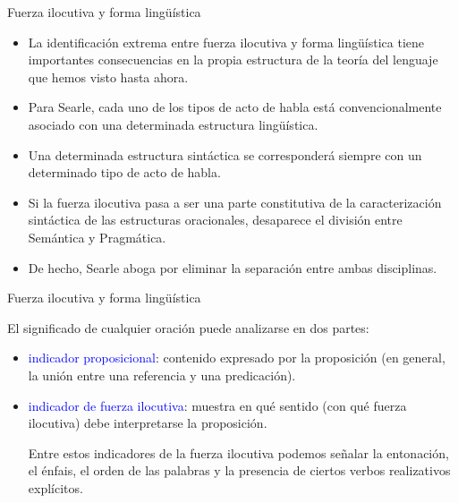 \documentclass{beamer}
\begin{document}
\begin{frame}{Fuerza ilocutiva y forma lingüística}

\begin{itemize}
	\item La identificación extrema entre fuerza ilocutiva y forma lingüística tiene importantes consecuencias en la propia estructura de la teoría del lenguaje que hemos visto hasta ahora.
	\item Para Searle, cada uno de los tipos de acto de habla está convencionalmente asociado con una determinada estructura lingüística. 
	\item Una determinada estructura sintáctica se corresponderá siempre con un determinado tipo de acto de habla.
	
	\pause
	 
	\item Si la fuerza ilocutiva pasa a ser una parte constitutiva de la caracterización sintáctica de las estructuras oracionales, desaparece el división entre Semántica y Pragmática.
	\item De hecho, Searle aboga por eliminar la separación entre ambas disciplinas.
\end{itemize}

\end{frame}

\begin{frame}{Fuerza ilocutiva y forma lingüística}

	El significado de cualquier oración puede analizarse en dos partes:
	 
\begin{itemize}
	\item \textcolor{blue}{indicador proposicional}: contenido expresado por la proposición (en general, la unión entre una referencia y una predicación).
	\item \textcolor{blue}{indicador de fuerza ilocutiva}: muestra en qué sentido (con qué fuerza ilocutiva) debe interpretarse la proposición. 
	
	Entre estos indicadores de la fuerza ilocutiva podemos señalar la entonación, el énfais, el orden de las palabras y la presencia de ciertos verbos realizativos explícitos.  
\end{itemize}

\end{frame}
\end{document}
